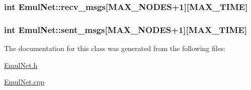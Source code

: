 \hypertarget{class_emul_net_ac7bbf4185187eacb894811c1d64e638b}{
\subsubsection[{recv\-\_\-msgs}]{\setlength{\rightskip}{0pt plus 5cm}int {\bf \-Emul\-Net\-::recv\-\_\-msgs}\mbox{[}{\bf \-M\-A\-X\-\_\-\-N\-O\-D\-E\-S}+1\mbox{]}\mbox{[}{\bf \-M\-A\-X\-\_\-\-T\-I\-M\-E}\mbox{]}}}\label{dc/db0/class_emul_net_ac7bbf4185187eacb894811c1d64e638b}
\hypertarget{class_emul_net_af2f3873bf04148bfdd8903da1b880734}{
\subsubsection[{sent\-\_\-msgs}]{\setlength{\rightskip}{0pt plus 5cm}int {\bf \-Emul\-Net\-::sent\-\_\-msgs}\mbox{[}{\bf \-M\-A\-X\-\_\-\-N\-O\-D\-E\-S}+1\mbox{]}\mbox{[}{\bf \-M\-A\-X\-\_\-\-T\-I\-M\-E}\mbox{]}}}\label{dc/db0/class_emul_net_af2f3873bf04148bfdd8903da1b880734}


\-The documentation for this class was generated from the following files\-:\begin{DoxyCompactItemize}
\item 
\hyperlink{_emul_net_8h}{\-Emul\-Net.\-h}\item 
\hyperlink{_emul_net_8cpp}{\-Emul\-Net.\-cpp}\end{DoxyCompactItemize}
